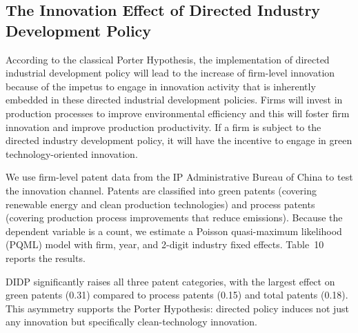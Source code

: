 \documentclass[11pt,a4paper]{article}
\begin{document}
\subsection{The Innovation Effect of Directed Industry Development Policy}

According to the classical Porter Hypothesis, the implementation of directed industrial development policy will lead to the increase of firm-level innovation because of the impetus to engage in innovation activity that is inherently embedded in these directed industrial development policies. Firms will invest in production processes to improve environmental efficiency and this will foster firm innovation and improve production productivity. If a firm is subject to the directed industry development policy, it will have the incentive to engage in green technology-oriented innovation.

We use firm-level patent data from the IP Administrative Bureau of China to test the innovation channel. Patents are classified into green patents (covering renewable energy and clean production technologies) and process patents (covering production process improvements that reduce emissions). Because the dependent variable is a count, we estimate a Poisson quasi-maximum likelihood (PQML) model with firm, year, and 2-digit industry fixed effects. Table~10 reports the results.


DIDP significantly raises all three patent categories, with the largest effect on green patents (0.31) compared to process patents (0.15) and total patents (0.18). This asymmetry supports the Porter Hypothesis: directed policy induces not just any innovation but specifically clean-technology innovation.
\end{document}
